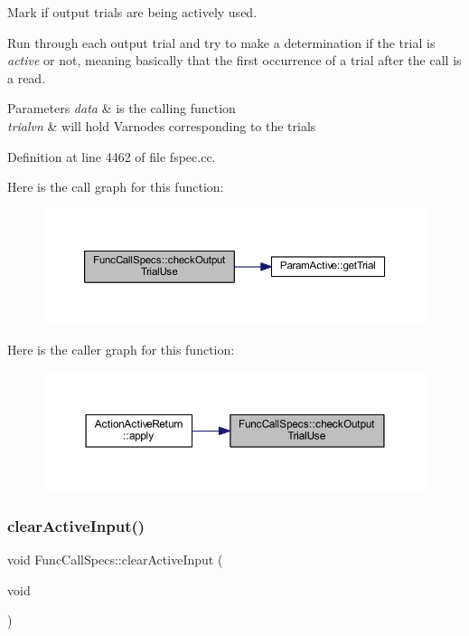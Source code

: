 Mark if output trials are being actively used. 

Run through each output trial and try to make a determination if the trial is {\itshape active} or not, meaning basically that the first occurrence of a trial after the call is a read. 
\begin{DoxyParams}{Parameters}
{\em data} & is the calling function \\
\hline
{\em trialvn} & will hold Varnodes corresponding to the trials \\
\hline
\end{DoxyParams}


Definition at line 4462 of file fspec.\+cc.

Here is the call graph for this function\+:
\nopagebreak
\begin{figure}[H]
\begin{center}
\leavevmode
\includegraphics[width=350pt]{class_func_call_specs_a82c50f8299ce305411880fc61b8b1907_cgraph}
\end{center}
\end{figure}
Here is the caller graph for this function\+:
\nopagebreak
\begin{figure}[H]
\begin{center}
\leavevmode
\includegraphics[width=350pt]{class_func_call_specs_a82c50f8299ce305411880fc61b8b1907_icgraph}
\end{center}
\end{figure}
\mbox{\label{class_func_call_specs_af24a93644abe9ee56a9aa86ba4cb0c9f}} 
\subsubsection{\texorpdfstring{clearActiveInput()}{clearActiveInput()}}
{\footnotesize\ttfamily void Func\+Call\+Specs\+::clear\+Active\+Input (\begin{DoxyParamCaption}\item[{void}]{ }\end{DoxyParamCaption})\hspace{0.3cm}{\ttfamily [inline]}}



